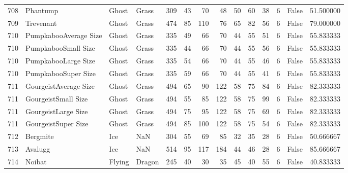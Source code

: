 \begin{tabular}{rlllrrrrrrrrlr}
 708 &                   Phantump &     Ghost &     Grass &    309 &   43 &      70 &       48 &       50 &       60 &     38 &           6 &      False &   51.500000 \\
 709 &                  Trevenant &     Ghost &     Grass &    474 &   85 &     110 &       76 &       65 &       82 &     56 &           6 &      False &   79.000000 \\
 710 &      PumpkabooAverage Size &     Ghost &     Grass &    335 &   49 &      66 &       70 &       44 &       55 &     51 &           6 &      False &   55.833333 \\
 710 &        PumpkabooSmall Size &     Ghost &     Grass &    335 &   44 &      66 &       70 &       44 &       55 &     56 &           6 &      False &   55.833333 \\
 710 &        PumpkabooLarge Size &     Ghost &     Grass &    335 &   54 &      66 &       70 &       44 &       55 &     46 &           6 &      False &   55.833333 \\
 710 &        PumpkabooSuper Size &     Ghost &     Grass &    335 &   59 &      66 &       70 &       44 &       55 &     41 &           6 &      False &   55.833333 \\
 711 &      GourgeistAverage Size &     Ghost &     Grass &    494 &   65 &      90 &      122 &       58 &       75 &     84 &           6 &      False &   82.333333 \\
 711 &        GourgeistSmall Size &     Ghost &     Grass &    494 &   55 &      85 &      122 &       58 &       75 &     99 &           6 &      False &   82.333333 \\
 711 &        GourgeistLarge Size &     Ghost &     Grass &    494 &   75 &      95 &      122 &       58 &       75 &     69 &           6 &      False &   82.333333 \\
 711 &        GourgeistSuper Size &     Ghost &     Grass &    494 &   85 &     100 &      122 &       58 &       75 &     54 &           6 &      False &   82.333333 \\
 712 &                   Bergmite &       Ice &       NaN &    304 &   55 &      69 &       85 &       32 &       35 &     28 &           6 &      False &   50.666667 \\
 713 &                    Avalugg &       Ice &       NaN &    514 &   95 &     117 &      184 &       44 &       46 &     28 &           6 &      False &   85.666667 \\
 714 &                     Noibat &    Flying &    Dragon &    245 &   40 &      30 &       35 &       45 &       40 &     55 &           6 &      False &   40.833333 \\

\end{tabular}
